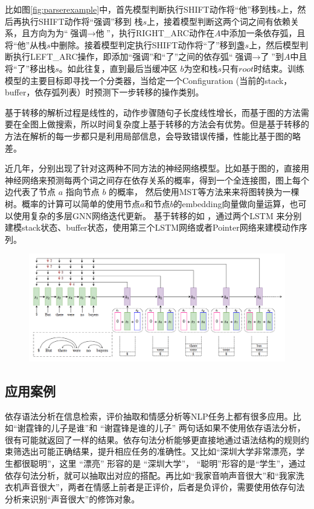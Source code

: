 比如图\ref{fig:parserexample}中，首先模型判断执行SHIFT动作将“他”移到栈$s$上，然后再执行SHIFT动作将“强调”移到 栈$s$上，接着模型判断这两个词之间有依赖关系，且方向为为“$\text{强调} \rightarrow \text{他}$”，执行RIGHT\_ARC动作在$A$中添加一条依存弧，且将“他”从栈$s$中删除。接着模型判定执行SHIFT动作将“了”移到盏$s$上，然后模型判断执行LEFT\_ARC操作，即添加“强调”和“了”之间的依存弧“$\text{强调} \rightarrow \text{了}$”到$A$中且将“了”移出栈$s$。如此往复，直到最后当缓冲区 $b$为空和栈$s$只有$root$时结束。训练模型的主要目标即寻找一个分类器，当给定一个Configuration (当前的stack，buffer，依存弧列表）时预测下一步转移的操作类别。

基于转移的解析过程是线性的，动作步骤随句子长度线性增长，而基于图的方法需要在全图上做搜索，所以时间复杂度上基于转移的方法会有优势。但是基于转移的方法在解析的每一步都只是利用局部信息，会导致错误传播，性能比基于图的略差。

近几年，分别出现了针对这两种不同方法的神经网络模型。比如基于图的\cite{dozat2016deep, ji2019graph, ma2017neural}，直接用神经网络来预测每两个词之间存在依存关系的概率，得到一个全连接图，图上每个边代表了节点 $a$ 指向节点 $b$ 的概率， 然后使用MST等方法来来将图转换为一棵树。概率的计算可以简单的使用节点$a$和节点$b$的embedding向量做向量运算，也可以使用复杂的多层GNN网络迭代更新。 基于转移的如 \cite{fernandez2019left, kiperwasser2016simple, ma2018stack}，通过两个LSTM 来分别建模stack状态、buffer状态，使用第三个LSTM网络或者Pointer网络来建模动作序列。 
\begin{figure}[h]
\centering
\includegraphics[scale=0.3]{img/chapter_nlp/parser_nn.png}
\label{fig:parser_nn}
\end{figure}


\subsection{应用案例}
依存语法分析在信息检索，评价抽取和情感分析等NLP任务上都有很多应用。比如“谢霆锋的儿子是谁”和
“谢霆锋是谁的儿子” 两句话如果不使用依存语法分析，很有可能就返回了一样的结果。依存句法分析能够更直接地通过语法结构的规则约束筛选出可能正确结果，提升相应任务的准确性。又比如“深圳大学非常漂亮，学生都很聪明”，这里 “漂亮” 形容的是 “深圳大学”， “聪明”形容的是“学生”，通过依存句法分析，就可以抽取出对应的搭配。再比如“我家音响声音很大”和“我家洗衣机声音很大”，两者在情感上前者是正评价，后者是负评价，需要使用依存句法分析来识别“声音很大”的修饰对象。


